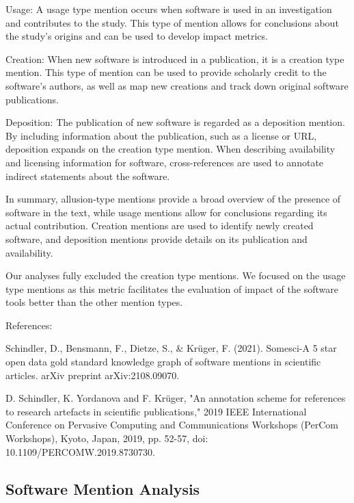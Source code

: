 Usage: A usage type mention occurs when software is used in an investigation and contributes to the study. This type of mention allows for conclusions about the study's origins and can be used to develop impact metrics. 
 
Creation: When new software is introduced in a publication, it is a creation type mention. This type of mention can be used to provide scholarly credit to the software's authors, as well as map new creations and track down original software publications.
 
Deposition: The publication of new software is regarded as a deposition mention. By including information about the publication, such as a license or URL, deposition expands on the creation type mention. When describing availability and licensing information for software, cross-references are used to annotate indirect statements about the software.
 
In summary, allusion-type mentions provide a broad overview of the presence of software in the text, while usage mentions allow for conclusions regarding its actual contribution. Creation mentions are used to identify newly created software, and deposition mentions provide details on its publication and availability.

Our analyses fully excluded the creation type mentions. We focused on the usage type mentions as this metric facilitates the evaluation of impact of the software tools better than the other mention types. 

References: 

Schindler, D., Bensmann, F., Dietze, S., & Krüger, F. (2021). Somesci-A 5 star open data gold standard knowledge graph of software mentions in scientific articles. arXiv preprint arXiv:2108.09070.

D. Schindler, K. Yordanova and F. Krüger, "An annotation scheme for references to research artefacts in scientific publications," 2019 IEEE International Conference on Pervasive Computing and Communications Workshops (PerCom Workshops), Kyoto, Japan, 2019, pp. 52-57, doi: 10.1109/PERCOMW.2019.8730730.


\subsection{Software Mention Analysis}


